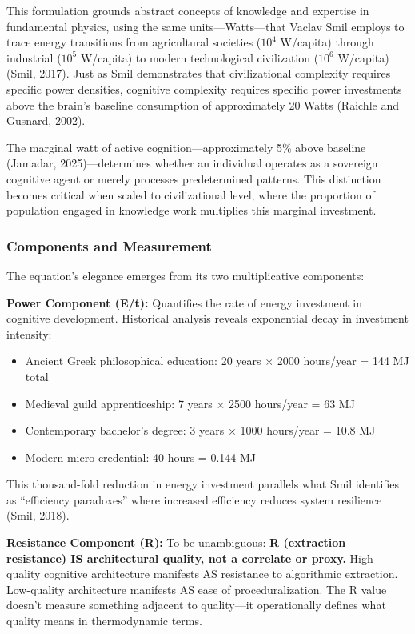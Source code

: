 This formulation grounds abstract concepts of knowledge and expertise in fundamental physics, using the same units---Watts---that Vaclav Smil employs to trace energy transitions from agricultural societies ($10^4$ W/capita) through industrial ($10^5$ W/capita) to modern technological civilization ($10^6$ W/capita) (Smil, 2017). Just as Smil demonstrates that civilizational complexity requires specific power densities, cognitive complexity requires specific power investments above the brain's baseline consumption of approximately 20 Watts (Raichle and Gusnard, 2002).

The marginal watt of active cognition---approximately 5\% above baseline (Jamadar, 2025)---determines whether an individual operates as a sovereign cognitive agent or merely processes predetermined patterns. This distinction becomes critical when scaled to civilizational level, where the proportion of population engaged in knowledge work multiplies this marginal investment.

\subsubsection{Components and Measurement}

The equation's elegance emerges from its two multiplicative components:

\textbf{Power Component (E/t):} Quantifies the rate of energy investment in cognitive development. Historical analysis reveals exponential decay in investment intensity:

\begin{itemize}
\item Ancient Greek philosophical education: 20 years $\times$ 2000 hours/year = 144 MJ total
\item Medieval guild apprenticeship: 7 years $\times$ 2500 hours/year = 63 MJ
\item Contemporary bachelor's degree: 3 years $\times$ 1000 hours/year = 10.8 MJ
\item Modern micro-credential: 40 hours = 0.144 MJ
\end{itemize}

This thousand-fold reduction in energy investment parallels what Smil identifies as ``efficiency paradoxes'' where increased efficiency reduces system resilience (Smil, 2018).

\textbf{Resistance Component (R):} To be unambiguous: \textbf{R (extraction resistance) IS architectural quality, not a correlate or proxy.} High-quality cognitive architecture manifests AS resistance to algorithmic extraction. Low-quality architecture manifests AS ease of proceduralization. The R value doesn't measure something adjacent to quality---it operationally defines what quality means in thermodynamic terms.


